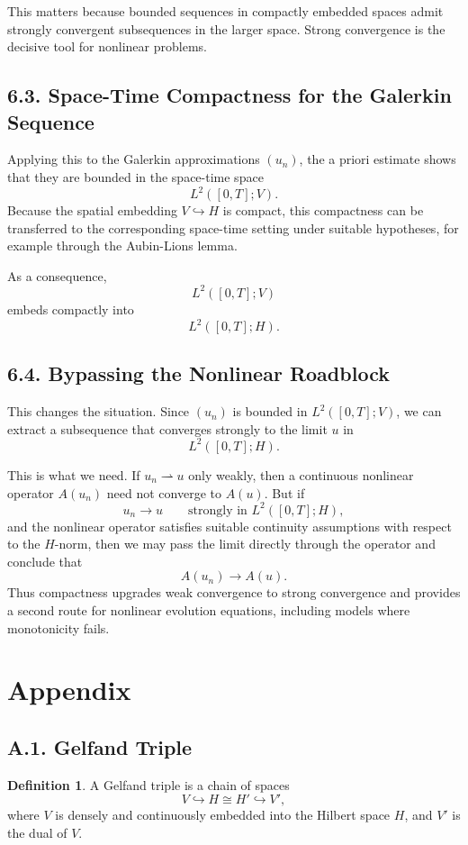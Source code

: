 \documentclass[11pt]{article}
\theoremstyle{definition}
\newtheorem{definition}{Definition}
\theoremstyle{remark}
\begin{document}
This matters because bounded sequences in compactly embedded spaces admit strongly convergent subsequences in the larger space. Strong convergence is the decisive tool for nonlinear problems.

\subsection*{6.3. Space-Time Compactness for the Galerkin Sequence}
Applying this to the Galerkin approximations \((u_n)\), the a priori estimate shows that they are bounded in the space-time space
\[
L^2([0,T];V).
\]
Because the spatial embedding \(V\hookrightarrow H\) is compact, this compactness can be transferred to the corresponding space-time setting under suitable hypotheses, for example through the Aubin-Lions lemma.

As a consequence,
\[
L^2([0,T];V)
\]
embeds compactly into
\[
L^2([0,T];H).
\]

\subsection*{6.4. Bypassing the Nonlinear Roadblock}
This changes the situation. Since \((u_n)\) is bounded in \(L^2([0,T];V)\), we can extract a subsequence that converges strongly to the limit \(u\) in
\[
L^2([0,T];H).
\]

This is what we need. If \(u_n\rightharpoonup u\) only weakly, then a continuous nonlinear operator \(A(u_n)\) need not converge to \(A(u)\). But if
\[
u_n\to u
\qquad
\text{strongly in } L^2([0,T];H),
\]
and the nonlinear operator satisfies suitable continuity assumptions with respect to the \(H\)-norm, then we may pass the limit directly through the operator and conclude that
\[
A(u_n)\to A(u).
\]
Thus compactness upgrades weak convergence to strong convergence and provides a second route for nonlinear evolution equations, including models where monotonicity fails.

\section*{Appendix}

\subsection*{A.1. Gelfand Triple}
\begin{definition}
A Gelfand triple is a chain of spaces
\[
V\hookrightarrow H\cong H'\hookrightarrow V',
\]
where \(V\) is densely and continuously embedded into the Hilbert space \(H\), and \(V'\) is the dual of \(V\).
\end{definition}
\end{document}
